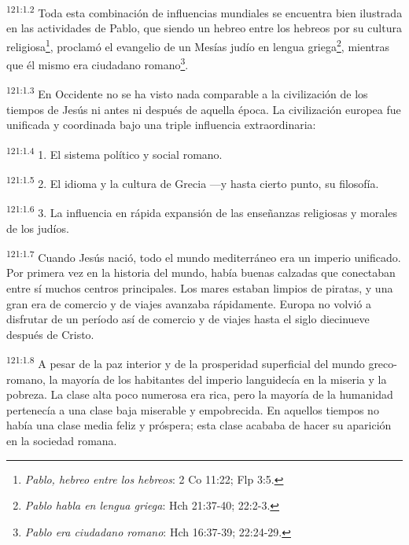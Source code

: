 \par
\textsuperscript{121:1.2} Toda esta combinación de influencias mundiales se encuentra bien ilustrada en las actividades de Pablo, que siendo un hebreo entre los hebreos por su cultura religiosa\footnote{\textit{Pablo, hebreo entre los hebreos}: 2 Co 11:22; Flp 3:5.}, proclamó el evangelio de un Mesías judío en lengua griega\footnote{\textit{Pablo habla en lengua griega}: Hch 21:37-40; 22:2-3.}, mientras que él mismo era ciudadano romano\footnote{\textit{Pablo era ciudadano romano}: Hch 16:37-39; 22:24-29.}.

\par
\textsuperscript{121:1.3} En Occidente no se ha visto nada comparable a la civilización de los tiempos de Jesús ni antes ni después de aquella época. La civilización europea fue unificada y coordinada bajo una triple influencia extraordinaria:

\par
\textsuperscript{121:1.4} 1. El sistema político y social romano.

\par
\textsuperscript{121:1.5} 2. El idioma y la cultura de Grecia ---y hasta cierto punto, su filosofía.

\par
\textsuperscript{121:1.6} 3. La influencia en rápida expansión de las enseñanzas religiosas y morales de los judíos.

\par
\textsuperscript{121:1.7} Cuando Jesús nació, todo el mundo mediterráneo era un imperio unificado. Por primera vez en la historia del mundo, había buenas calzadas que conectaban entre sí muchos centros principales. Los mares estaban limpios de piratas, y una gran era de comercio y de viajes avanzaba rápidamente. Europa no volvió a disfrutar de un período así de comercio y de viajes hasta el siglo diecinueve después de Cristo.

\par
\textsuperscript{121:1.8} A pesar de la paz interior y de la prosperidad superficial del mundo greco-romano, la mayoría de los habitantes del imperio languidecía en la miseria y la pobreza. La clase alta poco numerosa era rica, pero la mayoría de la humanidad pertenecía a una clase baja miserable y empobrecida. En aquellos tiempos no había una clase media feliz y próspera; esta clase acababa de hacer su aparición en la sociedad romana.

